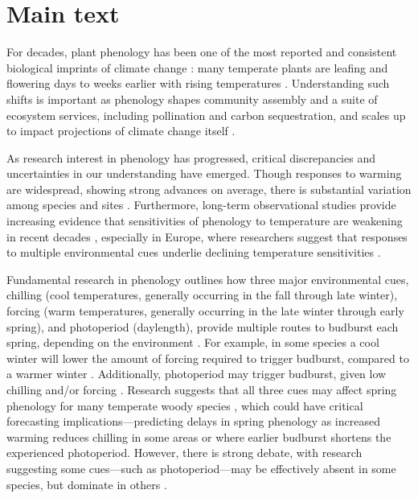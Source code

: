 \documentclass{article}
\begin{document}
\section* {Main text}
\par For decades, plant phenology has been one of the most reported and consistent biological imprints of climate change \emph{\citep{IPCC:2014sm}}: many temperate plants are leafing and flowering days to weeks earlier with rising temperatures \emph{\citep{millerrushing2008,menzel2006}}. Understanding such shifts is important as phenology shapes community assembly and a suite of ecosystem services, including pollination and carbon sequestration, and scales up to impact projections of climate change itself \emph{\citep{Cleland:2007or}}.
\par As research interest in phenology has progressed, critical discrepancies and uncertainties in our understanding have emerged. Though responses to warming are widespread, showing strong advances on average, there is substantial variation among species and sites \emph{\citep{Wolkovich:2012n}}. Furthermore, long-term observational studies provide increasing evidence that sensitivities of phenology to temperature are weakening in recent decades \emph{\citep{Rutishauser:2008,yu2010,wang2019}}, especially in Europe, where researchers suggest that responses to multiple environmental cues underlie declining temperature sensitivities \emph{\citep{fu2015}}. 
\par Fundamental research in phenology outlines how three major environmental cues, chilling (cool temperatures, generally occurring in the fall through late winter), forcing (warm temperatures, generally occurring in the late winter through early spring), and photoperiod (daylength), provide multiple routes to budburst each spring, depending on the environment \emph{\citep{chuine2016}}. For example, in some species a cool winter will lower the amount of forcing required to trigger budburst, compared to a warmer winter \emph{\citep{harrington2015}}. Additionally, photoperiod may trigger budburst, given low chilling and/or forcing \emph{\citep{zohner2016,Basler:2014aa, Caffarra:2011b}}. Research suggests that all three cues may affect spring phenology for many temperate woody species \emph{\citep{flynn2018,Basler:2014aa,Caffarra:2011qf}}, which could have critical forecasting implications---predicting delays in spring phenology as increased warming reduces chilling in some areas \emph{\citep{fraga2019}} or where earlier budburst shortens the experienced photoperiod. However, there is strong debate, with research suggesting some cues---such as photoperiod---may be effectively absent in some species, but dominate in others \emph{\citep{zohner2016,Heide:1993,Basler:2014aa,Singh:2017}}. 
\end{document}
